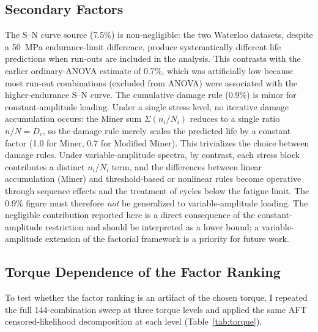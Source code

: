 \documentclass[12pt,a4paper]{article}
\begin{document}
\subsection{Secondary Factors}

The S--N curve source (7.5\%) is non-negligible: the two Waterloo
datasets, despite a 50~MPa endurance-limit difference, produce
systematically different life predictions when run-outs are included
in the analysis. This contrasts with the earlier ordinary-ANOVA
estimate of 0.7\%, which was artificially low because most run-out
combinations (excluded from ANOVA) were associated with the
higher-endurance S--N curve. The cumulative damage rule (0.9\%) is
minor for constant-amplitude loading. Under a single stress level,
no iterative damage accumulation occurs: the Miner sum
$\Sigma(n_i/N_i)$ reduces to a single ratio $n/N = D_c$, so the
damage rule merely scales the predicted life by a constant factor
(1.0 for Miner, 0.7 for Modified Miner). This trivializes the
choice between damage rules. Under variable-amplitude spectra,
by contrast, each stress block contributes a distinct $n_i/N_i$
term, and the differences between linear accumulation (Miner) and
threshold-based or nonlinear rules become operative through sequence
effects and the treatment of cycles below the fatigue limit. The
0.9\% figure must therefore \emph{not} be generalized to
variable-amplitude loading.
The negligible contribution reported here is a direct consequence of
the constant-amplitude restriction and should be interpreted as a
lower bound; a variable-amplitude extension of the factorial
framework is a priority for future work.

\subsection{Torque Dependence of the Factor Ranking}
\label{sec:torque}

To test whether the factor ranking is an artifact of the chosen torque,
I repeated the full 144-combination sweep at three torque levels and
applied the same AFT censored-likelihood decomposition at each level
(Table~\ref{tab:torque}).
\end{document}
